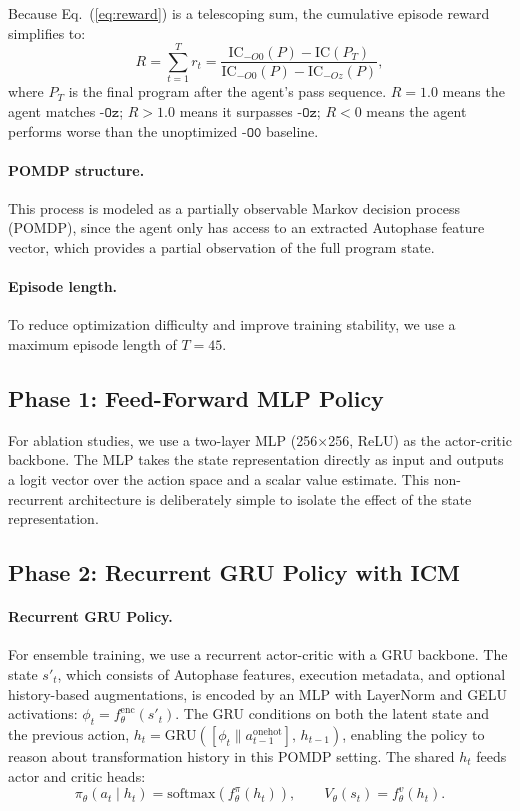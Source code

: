 \documentclass{article}
\begin{document}
Because Eq.~(\ref{eq:reward}) is a telescoping sum, the cumulative episode
reward simplifies to:
\begin{equation}
  R = \sum_{t=1}^{T} r_t
    = \frac{\mathrm{IC}_{-O0}(P) - \mathrm{IC}(P_T)}
           {\mathrm{IC}_{-O0}(P) - \mathrm{IC}_{-Oz}(P)},
\end{equation}
where $P_T$ is the final program after the agent's pass sequence.
$R = 1.0$ means the agent matches $\texttt{-Oz}$; $R > 1.0$ means it
surpasses $\texttt{-Oz}$; $R < 0$ means the agent performs worse than
the unoptimized $\texttt{-O0}$ baseline.

\paragraph{POMDP structure.}
This process is modeled as a partially observable Markov decision process (POMDP), since the agent only has access to an extracted Autophase feature vector, which provides a partial observation of the full program state.

\paragraph{Episode length.}
To reduce optimization difficulty and improve training stability, we use a maximum episode length of $T=45$.

\subsection{Phase 1: Feed-Forward MLP Policy}

For ablation studies, we use a two-layer MLP (256$\times$256, ReLU) as the
actor-critic backbone.  The MLP takes the state representation directly as
input and outputs a logit vector over the action space and a scalar value
estimate.  This non-recurrent architecture is deliberately simple to isolate
the effect of the state representation.

\subsection{Phase 2: Recurrent GRU Policy with ICM}
\label{sec:phase2}

\paragraph{Recurrent GRU Policy.}
For ensemble training, we use a recurrent actor-critic with a GRU backbone.
The state $s'_t$, which consists of Autophase features, execution metadata, and optional history-based augmentations, is encoded by an MLP with LayerNorm and GELU activations:
$\phi_t = f^{\mathrm{enc}}_{\theta}(s'_t)$.
The GRU conditions on both the latent state and the previous action,
$h_t = \mathrm{GRU}([\phi_t \| a_{t-1}^{\mathrm{onehot}}],\, h_{t-1})$,
enabling the policy to reason about transformation history in this POMDP setting.
The shared $h_t$ feeds actor and critic heads:
\begin{equation}
  \pi_{\theta}(a_t \mid h_t) = \mathrm{softmax}(f^{\pi}_{\theta}(h_t)),
  \qquad
  V_{\theta}(s_t) = f^{v}_{\theta}(h_t).
\end{equation}
\end{document}
